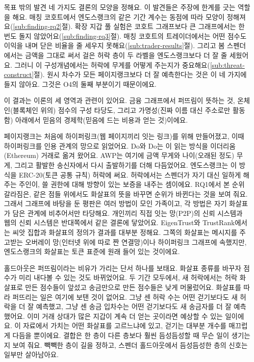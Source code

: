 목표 밖의 발견 네 가지도 결론의 모양을 정해요. 이 발견들은 주장에 한계를 긋는 역할을 해요. 매칭 코호트에서 엔도스랭크의 같은 기간 계수는 동점에 따라 모양이 정해져요(\ref{sub:finding-rq2}절). 확장 지갑 풀 실험은 코호트 그래프보다 큰 그래프에서는 한 번도 돌지 않았어요(\ref{sub:finding-rq3}절). 매칭 코호트의 트레이더에서는 어떤 점수도 이익을 내며 닫은 비율을 줄 세우지 못해요(\ref{sub:trader-results}절). 그리고 봄 스펜더에서는 금액을 그대로 써서 걸은 허락 층이 두 라벨을 엔도스랭크보다 더 잘 줄 세웠어요. 그러니 이 구성개념에서는 허락에 무게를 어떻게 주는지가 중요해요(\ref{sub:threat-construct}절). 원시 차수가 모든 페이지랭크보다 더 잘 예측한다는 것은 이 네 가지에 들지 않아요. 그것은 O4의 둘째 부분이기 때문이에요.


이 결과는 이론의 세 영역과 관련이 있어요. 금융 그래프에서 퍼뜨림이 뜻하는 것, 온체인(블록체인 위의) 점수의 구성 타당도, 그리고 가명성(진짜 이름 대신 주소로만 활동함) 아래에서 믿음의 경제학(믿음에 드는 비용과 얻는 것)이에요.


페이지랭크는 처음에 하이퍼링크(웹 페이지끼리 잇는 링크)를 위해 만들어졌고, 이때 하이퍼링크를 인용 관계의 망으로 읽었어요. Do와 Do는 이 읽는 방식을 이더리움(Ethereum) 거래로 옮겨 왔어요. AWP는 여기에 금액 무게와 나이(오래된 정도) 무게, 그리고 활발한 송신자에서 다시 출발하기를 더해 다듬었어요. 엔도스랭크는 이 방식을 ERC-20(토큰 공통 규칙) 허락에 써요. 허락에서는 스펜더가 자기 대신 일하게 해 주는 주인이, 쓸 권한에 대해 방향이 있는 보증을 내주는 셈이에요. RQ1에서 본 순위 갈라짐은, 같은 점들 위에서도 화살표의 뜻을 바꾸면 순위가 바뀐다는 것을 보여 줘요. 그래서 그래프에 바탕을 둔 평판은 여러 방법이 모인 가족이고, 각 방법은 자기 화살표가 담은 관계에 비추어서만 타당해요. 개인끼리 직접 잇는 망(P2P)의 신뢰 시스템과 웹의 신뢰 시스템은 반대쪽에서 같은 결론에 닿았어요. EigenTrust와 TrustRank에서는 씨앗 집합과 화살표의 정의가 결과를 대부분 정해요. 그쪽의 화살표는 메시지를 주고받는 오버레이 망(인터넷 위에 따로 짠 연결망)이나 하이퍼링크 그래프에 속했지만, 엔도스랭크의 화살표는 토큰 표준에 원래 들어 있는 것이에요.

홀드아웃은 퍼뜨림이라는 비유가 가리는 단서 하나를 보태요. 화살표 종류를 바꾸자 점수가 미리 내다볼 수 있는 것도 바뀌었어요. 두 기간 모두에서, 새 허락에서는 허락 화살표로 만든 점수들이 앞섰고 송금만으로 만든 점수들은 낮게 머물렀어요. 화살표를 따라 퍼뜨리는 일은 여기에 보탠 것이 없어요. 그냥 센 허락 수는 어떤 걷기보다도 새 허락을 더 잘 예측했고, 그냥 센 송금 입차수는 어떤 걷기보다도 새 송금자를 더 잘 예측했어요. 이미 거래 상대가 많은 지갑이 계속 더 얻는 곳이라면 예상할 수 있는 일이에요. 이 자료에서 가치는 어떤 화살표를 고르느냐에 있고, 걷기는 대부분 개수를 매끄럽게 다듬을 뿐이에요. 결합은 한 층이 다른 층보다 훨씬 듬성듬성할 때 무슨 일이 생기는지 보여 줘요. 빽빽한 층이 길을 정하고, 스펜더 홀드아웃에서 듬성듬성한 층의 신호는 일부만 살아남아요.

